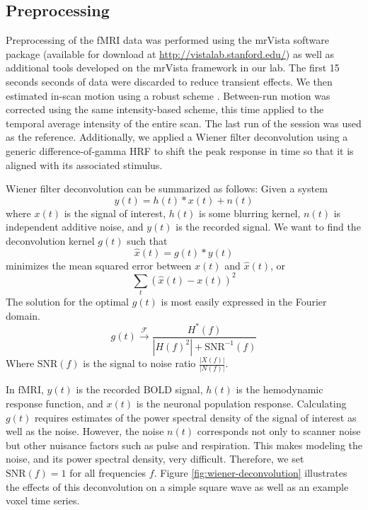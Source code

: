 \documentclass[preprint,authoryear,12pt]{elsarticle}
\begin{document}
\subsection{Preprocessing}
Preprocessing of the fMRI data was performed using the mrVista software package (available for download at \url{http://vistalab.stanford.edu/}) as well as additional tools developed on the mrVista framework in our lab. 
The first 15 seconds seconds of data  were discarded to reduce transient effects.
We then estimated in-scan motion using a robust scheme \citep{Nestares-and-Heeger-2000}. 
Between-run motion was corrected using the same intensity-based scheme, this time applied to the temporal average intensity of the entire scan. 
The last run of the session was used as the reference. 
Additionally, we applied a Wiener filter deconvolution \citep{Wiener} using a generic difference-of-gamma HRF \citep{Glover} to shift the peak response in time so that it is aligned with its associated stimulus.

Wiener filter deconvolution can be summarized as follows:
Given a system
\begin{equation}
y(t) = h(t) \ast x(t) + n(t)
\end{equation}
where $x(t)$ is the signal of interest, $h(t)$ is some blurring kernel, $n(t)$ is independent additive noise, and $y(t)$ is the recorded signal.
We want to find the deconvolution kernel $g(t)$ such that 
\begin{equation}
\hat{x}(t) = g(t) \ast y(t)
\end{equation}
minimizes the mean squared error between $x(t)$ and $\hat{x}(t)$, or
\begin{equation}
\sum_{t}{\left( \hat{x}(t) - x(t) \right)^{2}}
\end{equation}
The solution for the optimal $g(t)$ is most easily expressed in the Fourier domain.
\begin{equation}
g(t) \xrightarrow{\mathcal{F}} \frac{H^{*}(f)}{\left|H(f)^{2}\right| + \mbox{SNR}^{-1}(f)}
\end{equation}
Where $\mbox{SNR}(f)$ is the signal to noise ratio $\frac{\left| X(f) \right|}{\left| N(f) \right|}$.

In fMRI, $y(t)$ is the recorded BOLD signal, $h(t)$ is the hemodynamic response function, and $x(t)$ is the neuronal population response.
Calculating $g(t)$ requires estimates of the power spectral density of the signal of interest as well as the noise.
However, the noise $n(t)$ corresponds not only to scanner noise but other nuisance factors such as pulse and respiration.
This makes modeling the noise, and its power spectral density, very difficult.
Therefore, we set $\mbox{SNR}(f) = 1$ for all frequencies $f$.
Figure \ref{fig:wiener-deconvolution} illustrates the effects of this deconvolution on a simple square wave as well as an example voxel time series.
\end{document}
